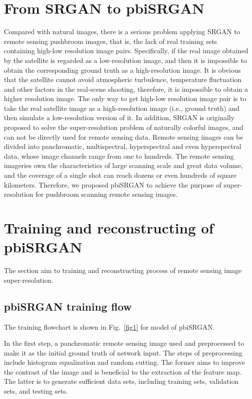 \documentclass[10pt,twocolumn,letterpaper]{article}
\begin{document}
\section{From SRGAN to pbiSRGAN}
Compared with natural images, there is a serious problem applying SRGAN to remote sensing pushbroom images, that is, the lack of real training sets containing high-low resolution image pairs. Specifically, if the real image obtained by the satellite is regarded as a low-resolution image, and then it is impossible to obtain the corresponding ground truth as a high-resolution image. It is obvious that the satellite cannot avoid atmospheric turbulence, temperature fluctuation and other factors in the real-scene shooting, therefore, it is impossible to obtain a higher resolution image. The only way to get high-low resolution image pair is to take the real satellite image as a high-resolution image (i.e., ground truth) and then simulate a low-resolution version of it. In addition, SRGAN is originally proposed to solve the super-resolution problem of naturally colorful images, and can not be directly used for remote sensing data. Remote sensing images can be divided into panchromatic, multispectral, hyperspectral and even hyperspectral data, whose image channels range from one to hundreds. The remote sensing imageries own the characteristics of large scanning scale and great data volume, and the coverage of a single shot can reach dozens or even hundreds of square kilometers. Therefore, we proposed pbiSRGAN to achieve the purpose of super-resolution for pushbroom scanning remote sensing images.

\section{Training and reconstructing of pbiSRGAN}
The section aim to training and reconstructing process of remote sensing image super-resolution. 
\subsection{pbiSRGAN training flow}
The training flowchart is shown in Fig.~\ref{fig1} for model of pbiSRGAN.

In the first step,  a panchromatic remote sensing image used and preprocessed to make it as the initial ground truth of network input. The steps of preprocessing include histogram equalization and random cutting. The former aims to improve the contrast of the image and is beneficial to the extraction of the feature map. The latter is to generate sufficient data sets, including training sets, validation sets, and testing sets.
\end{document}
